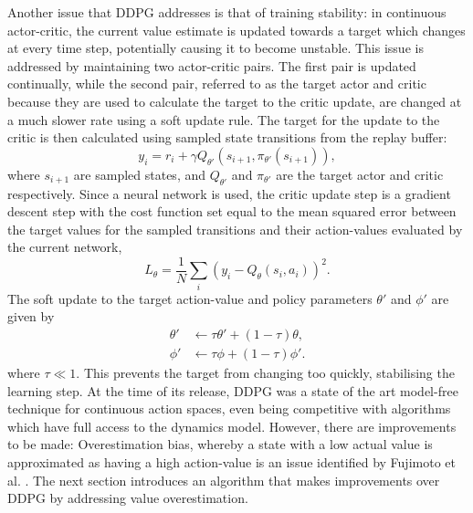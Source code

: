 Another issue that DDPG addresses is that of training stability: in continuous actor-critic, the current value estimate is updated towards a target which changes at every time step, potentially causing it to become unstable. This issue is addressed by maintaining two actor-critic pairs. The first pair is updated continually, while the second pair, referred to as the target actor and critic because they are used to calculate the target to the critic update, are changed at a much slower rate using a soft update rule.
The target for the update to the critic is then calculated using sampled state transitions from the replay buffer:
\begin{equation}
    y_i = r_i + \gamma Q_{\theta'}(s_{i+1}, \pi_{\theta'}(s_{i+1})),
\end{equation}
where $s_{i+1}$ are sampled states, and $Q_{\theta'}$ and $\pi_{\theta'}$ are the target actor and critic respectively. Since a neural network is used, the critic update step is a gradient descent step with the cost function set equal to the mean squared error between the target values for the sampled transitions and their action-values evaluated by the current network,
\begin{equation}
    L_{\theta}=\frac{1}{N} \sum_i (y_i - Q_{\theta}(s_i,a_i))^2.
\end{equation}
The soft update to the target action-value and policy parameters $\theta'$ and $\phi'$ are given by
\begin{equation}
\begin{split}
    \theta' &\leftarrow \tau \theta' + (1 - \tau) \theta, \\
    \phi' &\leftarrow \tau \phi + (1 - \tau) \phi'.
\end{split}
\end{equation}
where $\tau \ll 1$. This prevents the target from changing too quickly, stabilising the learning step. 
At the time of its release, DDPG was a state of the art model-free technique for continuous action spaces, 
even being competitive with algorithms which have full access to the dynamics model.
However, there are improvements to be made: Overestimation bias, whereby a state with a low actual value is approximated as having a high action-value is an issue identified by Fujimoto et al. \cite{Fujimoto2018}.
The next section introduces an algorithm that makes improvements over DDPG by addressing value overestimation.

